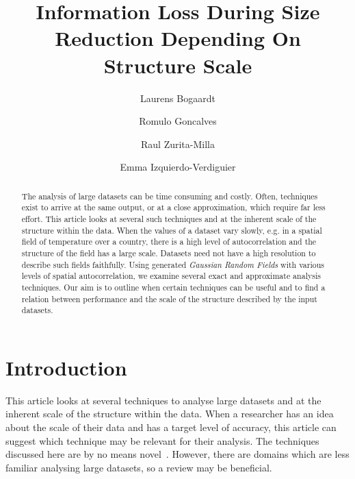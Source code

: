 \documentclass{acm_proc_article-sp}
\begin{document}
\title{\textbf{Information Loss During Size Reduction Depending On Structure Scale}}

\author[1]{Laurens Bogaardt}
\author[1]{Romulo Goncalves}
\author[2]{Raul Zurita-Milla}
\author[2,3]{Emma Izquierdo-Verdiguier}


\date{} %
\maketitle
\thispagestyle{empty} %

\begin{abstract}
The analysis of large datasets can be time consuming and costly. Often, techniques exist to arrive at the same output, or at a close approximation, which require far less effort. This article looks at several such techniques and at the inherent scale of the structure within the data. When the values of a dataset vary slowly, e.g. in a spatial field of temperature over a country, there is a high level of autocorrelation and the structure of the field has a large scale. Datasets need not have a high resolution to describe such fields faithfully. Using generated \textit{Gaussian Random Fields} with various levels of spatial autocorrelation, we examine several exact and approximate analysis techniques. Our aim is to outline when certain techniques can be useful and to find a relation between performance and the scale of the structure described by the input datasets.
\end{abstract}

\section{Introduction}
\label{sec:Introduction}

This article looks at several techniques to analyse large datasets and at the inherent scale of the structure within the data. When a researcher has an idea about the scale of their data and has a target level of accuracy, this article can suggest which technique may be relevant for their analysis. The techniques discussed here are by no means novel~\cite{Golub1970, Bjorck1973, Chan1982}. However, there are domains which are less familiar analysing large datasets, so a review may be beneficial.
\end{document}
